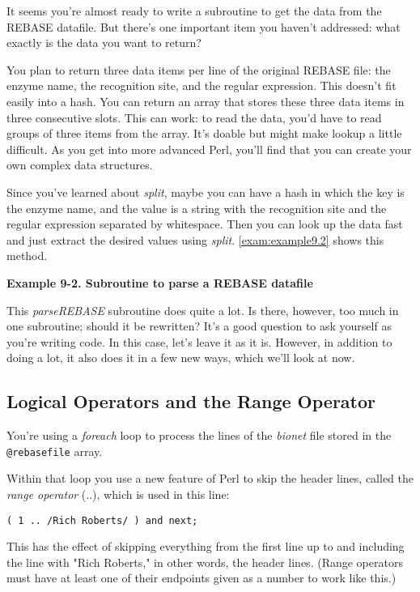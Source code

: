 It seems you're almost ready to write a subroutine to get the data from the REBASE datafile. But there's one important item you haven't addressed: what exactly is the data you want to return?

You plan to return three data items per line of the original REBASE file: the enzyme name, the recognition site, and the regular expression. This doesn't fit easily into a hash. You can return an array that stores these three data items in three consecutive slots. This can work: to read the data, you'd have to read groups of three items from the array. It's doable but might make lookup a little difficult. As you get into more advanced Perl, you'll find that you can create your own complex data structures.

Since you've learned about \textit{split}, maybe you can have a hash in which the key is the enzyme name, and the value is a string with the recognition site and the regular expression separated by whitespace. Then you can look up the data fast and just extract the desired values using \textit{split}. \autoref{exam:example9.2} shows this method. 

\textbf{Example 9-2. Subroutine to parse a REBASE datafile}


This \textit{parseREBASE} subroutine does quite a lot. Is there, however, too much in one subroutine; should it be rewritten? It's a good question to ask yourself as you're writing code. In this case, let's leave it as it is. However, in addition to doing a lot, it also does it in a few new ways, which we'll look at now. 

\subsection{Logical Operators and the Range Operator}
You're using a \textit{foreach} loop to process the lines of the \textit{bionet} file stored in the \verb|@rebasefile| array.

Within that loop you use a new feature of Perl to skip the header lines,
called the \textit{range operator} (..), which is used in this line:

\begin{lstlisting}
( 1 .. /Rich Roberts/ ) and next;
\end{lstlisting}

This has the effect of skipping everything from the first line up to and including the line with "Rich Roberts," in other words, the header lines. (Range operators must have at least one of their endpoints given as a number to work like this.)

